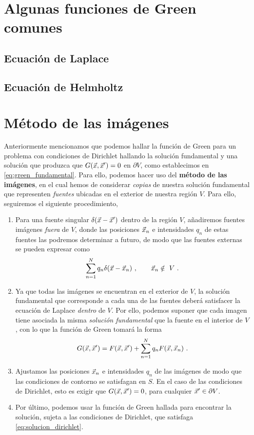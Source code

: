 \section{Algunas funciones de Green comunes}

\subsection{Ecuación de Laplace}

\subsection{Ecuación de Helmholtz}

\section{Método de las imágenes}

Anteriormente mencionamos que podemos hallar la función de Green para un problema con condiciones de Dirichlet hallando la solución fundamental y una solución que produzca que $G(\vec{x},\vec{x}') = 0$ en $\partial V$, como establecimos en \eqref{eq:green_fundamental}. Para ello, podemos hacer uso del \textbf{método de las imágenes}, en el cual hemos de considerar \emph{copias} de nuestra solución fundamental que representen \emph{fuentes} ubicadas en el exterior de nuestra región $V$. Para ello, seguiremos el siguiente procedimiento,
\begin{enumerate}
    \item Para una fuente singular $\delta(\vec{x} - \vec{x}')$ dentro de la región $V$, añadiremos fuentes imágenes \emph{fuera} de $V$, donde las posiciones $\vec{x}_n$ e intensidades $q_n$ de estas fuentes las podremos determinar a futuro, de modo que las fuentes externas se pueden expresar como
    \begin{equation}
        \sum_{n=1}^N q_n \delta(\vec{x} - \vec{x}_n) \ , \qquad \vec{x}_n \notin \ V \ .
    \end{equation}

    \item Ya que todas las imágenes se encuentran en el exterior de $V$, la solución fundamental que corresponde a cada una de las fuentes deberá satisfacer la ecuación de Laplace \emph{dentro} de $V$. Por ello, podemos suponer que cada imagen tiene asociada la misma \emph{solución fundamental} que la fuente en el interior de $V$, con lo que la función de Green tomará la forma
    \begin{equation}
        G(\vec{x}, \vec{x}') = F(\vec{x}, \vec{x}') + \sum_{n=1}^N q_n F(\vec{x},\vec{x}_n) \ .
    \end{equation}

    \item Ajustamos las posiciones $\vec{x}_n$ e intensidades $q_n$ de las imágenes de modo que las condiciones de contorno se satisfagan en $S$. En el caso de las condiciones de Dirichlet, esto es exigir que $G(\vec{x}, \vec{x}') = 0$, para cualquier $\vec{x}' \in \partial V$.

    \item Por último, podemos usar la función de Green hallada para encontrar la solución, sujeta a las condiciones de Dirichlet, que satisfaga \eqref{eq:solucion_dirichlet}.
\end{enumerate}

